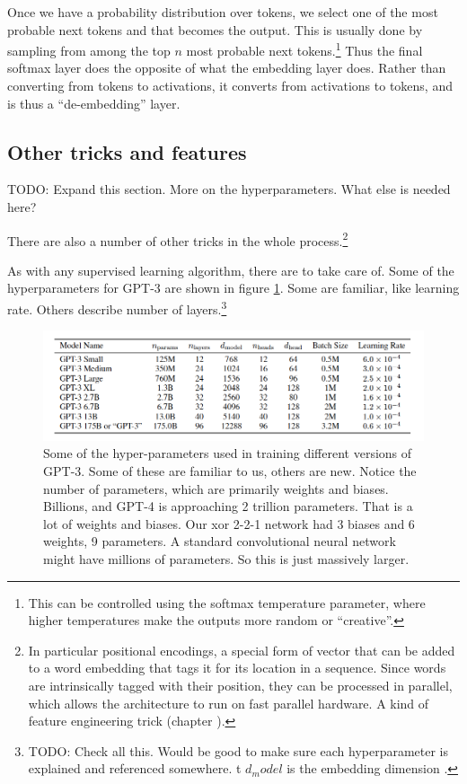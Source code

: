 Once we have a probability distribution over tokens, we select one of the most probable next tokens and that becomes the output. This is usually done by sampling from among the top $n$ most probable next tokens.\footnote{This can be controlled using the softmax temperature parameter, where higher temperatures make the outputs more random or ``creative''.} Thus the final softmax layer does the opposite of what the embedding layer does. Rather than converting from tokens to activations, it converts from activations to tokens, and is thus a ``de-embedding'' layer.

\subsection{Other tricks and features}

TODO: Expand this section. More on the hyperparameters. What else is needed here?

There are also a number of other tricks in the whole process.\footnote{In particular positional encodings, a special form of vector that can be added to a word embedding that tags it for its location in a sequence. Since words are intrinsically tagged with their position, they can be processed in parallel, which allows the architecture to run on fast parallel hardware. A kind of feature engineering trick (chapter ).  }

As with any supervised learning algorithm, there are  to take care of. Some of the hyperparameters for GPT-3 are shown in figure \ref{gptParams}. Some are familiar, like learning rate. Others describe number of layers.\footnote{TODO: Check all this.  Would be good to make sure each hyperparameter is explained and referenced somewhere. t $d_model$ is the embedding dimension .}

\begin{figure}[h]
\centering
\includegraphics[scale=.4]{./images/gpt3_params.png}
\caption[GPT Technical report. Todo]{Some of the hyper-parameters used in training different versions of GPT-3. Some of these are familiar to us, others are new. Notice the number of parameters, which are primarily weights and biases.  Billions, and GPT-4 is approaching 2 trillion parameters.  That is a lot of weights and biases.  Our xor 2-2-1 network had 3 biases and 6 weights, 9 parameters.  A standard convolutional neural network might have millions of parameters. So this is just massively larger. }
\label{gptParams}
\end{figure}

